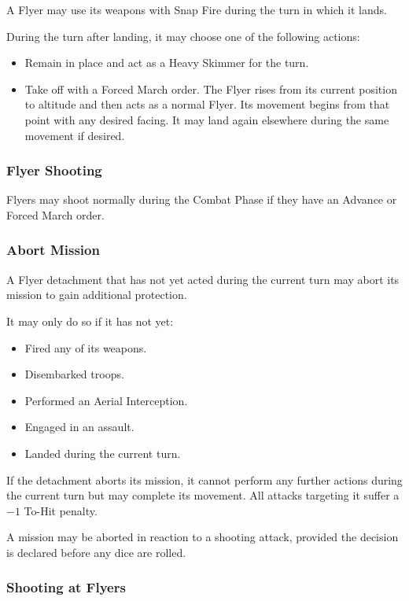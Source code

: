 A Flyer may use its weapons with Snap Fire during the turn in which it lands.

During the turn after landing, it may choose one of the following actions:

\begin{itemize}
    \item Remain in place and act as a Heavy Skimmer for the turn.

    \item Take off with a Forced March order. The Flyer rises from its current position to altitude and then acts as a normal Flyer. Its movement begins from that point with any desired facing. It may land again elsewhere during the same movement if desired.
\end{itemize}

\subsubsection{Flyer Shooting}

Flyers may shoot normally during the Combat Phase if they have an Advance or Forced March order.

\subsubsection{Abort Mission}

A Flyer detachment that has not yet acted during the current turn may abort its mission to gain additional protection.

It may only do so if it has not yet:

\begin{itemize}
    \item Fired any of its weapons.
    \item Disembarked troops.
    \item Performed an Aerial Interception.
    \item Engaged in an assault.
    \item Landed during the current turn.
\end{itemize}

If the detachment aborts its mission, it cannot perform any further actions during the current turn but may complete its movement. All attacks targeting it suffer a $-1$ To-Hit penalty.

A mission may be aborted in reaction to a shooting attack, provided the decision is declared before any dice are rolled.

\subsubsection{Shooting at Flyers}

